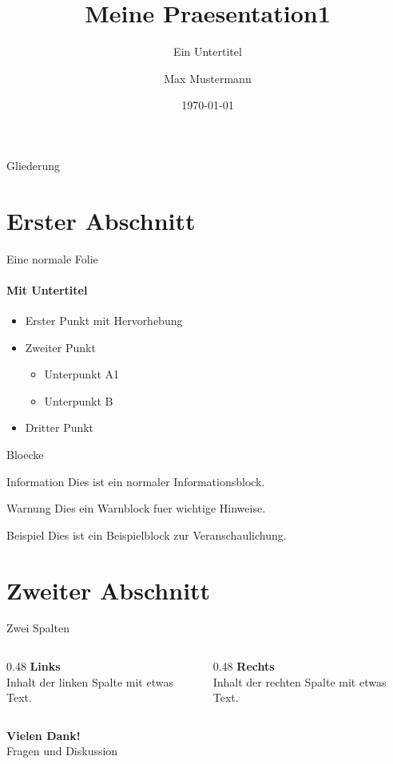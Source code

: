 \documentclass[aspectratio=169]{beamer}
\title{Meine Praesentation1}
\subtitle{Ein Untertitel}
\author{Max Mustermann}
\date{\today}
\begin{document}
 \begin{frame}[plain]\titlepage\end{frame}

\begin{frame}{Gliederung}\tableofcontents\end{frame}

\section{Erster Abschnitt}

\begin{frame}{Eine normale Folie}
  \framesubtitle{Mit Untertitel}
  \begin{itemize}
    \item Erster Punkt mit \alert{Hervorhebung}
    \item Zweiter Punkt
      \begin{itemize}
        \item Unterpunkt A1
        \item Unterpunkt B
      \end{itemize}
    \item Dritter Punkt
  \end{itemize}
\end{frame}

\begin{frame}{Bloecke}
  \begin{block}{Information}
    Dies ist ein normaler Informationsblock.
  \end{block}
  \begin{alertblock}{Warnung}
    Dies  ein Warnblock fuer wichtige Hinweise.
  \end{alertblock}
  \begin{exampleblock}{Beispiel}
    Dies ist ein Beispielblock zur Veranschaulichung.
  \end{exampleblock}
\end{frame}

\section{Zweiter Abschnitt}

\begin{frame}{Zwei Spalten}
  \begin{columns}[T]
    \begin{column}{0.48\textwidth}
      \textbf{Links}\\[0.5em]
      Inhalt der linken Spalte mit etwas Text.
    \end{column}
    \begin{column}{0.48\textwidth}
      \textbf{Rechts}\\[0.5em]
      Inhalt der rechten Spalte mit etwas Text.
    \end{column}
  \end{columns}
\end{frame}

\begin{frame}[plain]
  \begin{center}
    {\color{primary}\Huge\bfseries Vielen Dank!}\\[1em]
    {\large Fragen und Diskussion}
  \end{center}
\end{frame}
\end{document}
